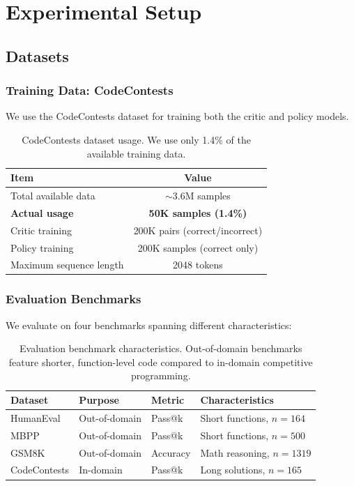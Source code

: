 \section{Experimental Setup}

\subsection{Datasets}

\subsubsection{Training Data: CodeContests}

We use the CodeContests dataset \citep{li2022competition} for training both the critic and policy models.

\begin{table}[h]
\centering
\caption{CodeContests dataset usage. We use only 1.4\% of the available training data.}
\label{tab:codecontests_data}
\begin{tabular}{lc}
\toprule
\textbf{Item} & \textbf{Value} \\
\midrule
Total available data & $\sim$3.6M samples \\
\textbf{Actual usage} & \textbf{50K samples (1.4\%)} \\
Critic training & 200K pairs (correct/incorrect) \\
Policy training & 200K samples (correct only) \\
Maximum sequence length & 2048 tokens \\
\bottomrule
\end{tabular}
\end{table}

\subsubsection{Evaluation Benchmarks}

We evaluate on four benchmarks spanning different characteristics:

\begin{table}[h]
\centering
\caption{Evaluation benchmark characteristics. Out-of-domain benchmarks feature shorter, function-level code compared to in-domain competitive programming.}
\label{tab:eval_benchmarks}
\begin{tabular}{llll}
\toprule
\textbf{Dataset} & \textbf{Purpose} & \textbf{Metric} & \textbf{Characteristics} \\
\midrule
HumanEval & Out-of-domain & Pass@k & Short functions, $n=164$ \\
MBPP & Out-of-domain & Pass@k & Short functions, $n=500$ \\
GSM8K & Out-of-domain & Accuracy & Math reasoning, $n=1319$ \\
CodeContests & In-domain & Pass@k & Long solutions, $n=165$ \\
\bottomrule
\end{tabular}
\end{table}

